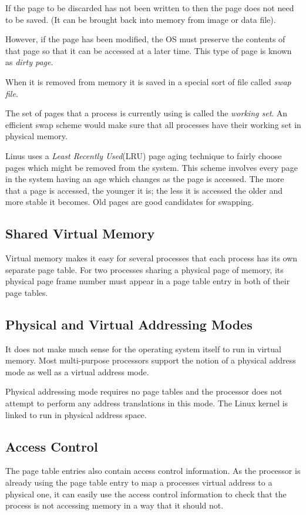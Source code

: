 \documentclass[a4paper,12pt]{book}
\begin{document}
If the page to be discarded has not been written to then the page does not need
to be saved. (It can be brought back into memory from image or data file).

However, if the page has been modified, the OS must preserve the contents of
that page so that it can be accessed at a later time. This type of page is
known as \emph{dirty page}. 

When it is removed from memory it is saved in a  special sort of file called
\emph{swap file}. 

The set of pages that a process is currently using is called the \emph{working
set}. An efficient swap scheme would make sure that all processes have their
working set in physical memory. 

Linus uses a \emph{Least Recently Used}(LRU) page aging technique to fairly
choose pages which might be removed from the system. This scheme involves every
page in the system having an age which changes as the page is accessed. The more
that a page is accessed, the younger it is; the less it is accessed the older
and more stable it becomes. Old pages are good candidates for swapping.
\subsection{Shared Virtual Memory}
Virtual memory makes it easy for several processes that each process has its own
separate page table. For two processes sharing a physical page of memory, its
physical page frame number must appear in a page table entry in both of their
page tables. 
\subsection{Physical and Virtual Addressing Modes}
It does not make much sense for the operating  system itself to run in virtual
memory. Most multi-purpose processors support the notion of a physical address
mode as well as a virtual address mode. 

Physical addressing mode requires no page tables and the processor does not
attempt to perform any address translations in this mode. The Linux kernel is
linked to run in physical address space. 
\subsection{Access Control}
The page table entries also contain access control information. As the processor
is already using the page table entry to map a processes virtual address to a
physical one, it can easily use the access control information to check that the
process is not accessing memory in a way that it should not. 
\end{document}
